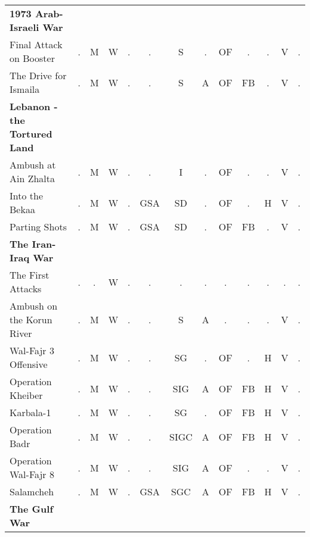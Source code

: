 \documentclass[a4paper]{article}
\newenvironment{texte}{\rmfamily\footnotesize}{}
\begin{document}
\begin{texte}
\begin{tabular}{lcccccccccccc}
\bf 1973 Arab-Israeli War \\

     Final Attack on Booster                       & . &  M &  W &  . &  .  & S  & . & OF &  . & . &  V & . \\
     The Drive for Ismaila                         & . &  M &  W &  . &  .  & S  & A & OF & FB & . &  V & . \\

\bf Lebanon - the Tortured Land \\

     Ambush at Ain Zhalta                          & . &  M &  W &  . &  .  & I  & . & OF &  . & . &  V & . \\
     Into the Bekaa                                & . &  M &  W &  . & GSA & SD & . & OF &  . & H &  V & . \\
     Parting Shots                                 & . &  M &  W &  . & GSA & SD & . & OF & FB & . &  V & . \\

\bf The Iran-Iraq War \\

     The First Attacks                             & . &  . &  W &  . &  .  &  .    & . &  . &  . & . &  . & . \\
     Ambush on the Korun River                     & . &  M &  W &  . &  .  & S     & A &  . &  . & . &  V & . \\
     Wal-Fajr 3 Offensive                          & . &  M &  W &  . &  .  & SG    & . & OF &  . & H &  V & . \\
     Operation Kheiber                             & . &  M &  W &  . &  .  & SIG   & A & OF & FB & H &  V & . \\
     Karbala-1                                     & . &  M &  W &  . &  .  & SG    & . & OF & FB & H &  V & . \\
     Operation Badr                                & . &  M &  W &  . &  .  & SIGC  & A & OF & FB & H &  V & . \\
     Operation Wal-Fajr 8                          & . &  M &  W &  . &  .  & SIG   & A & OF &  . & . &  V & . \\
     Salamcheh                                     & . &  M &  W &  . & GSA & SGC   & A & OF & FB & H &  V & . \\

\bf The Gulf War \\


\end{tabular}
\end{texte}
\end{document}
